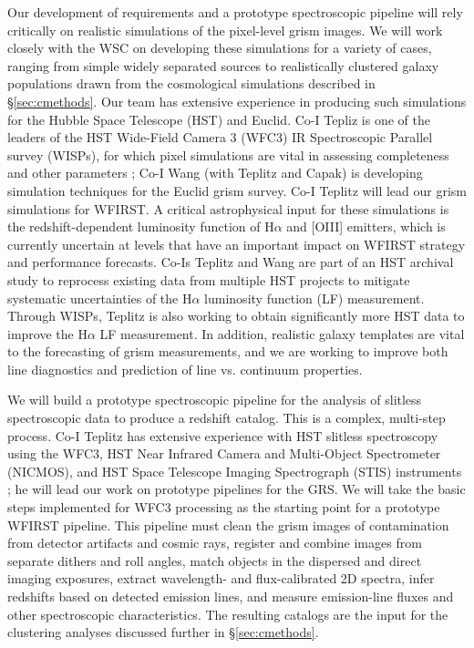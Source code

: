  Our development of requirements and a prototype spectroscopic
pipeline will rely critically on realistic simulations of the
pixel-level grism images.  We will work closely with the WSC on
developing these simulations for a variety of cases, ranging from
simple widely separated sources to realistically clustered galaxy
populations drawn from the cosmological simulations described in
\S\ref{sec:cmethods}.  Our team has extensive experience in producing
such simulations for the Hubble Space Telescope (HST) and Euclid.  Co-I Tepliz is one of the leaders
of the HST Wide-Field Camera 3 (WFC3) IR Spectroscopic Parallel survey (WISPs), for which
pixel simulations are vital in assessing completeness and other
parameters \cite{Colbert13}; Co-I Wang (with Teplitz and Capak) is
developing simulation techniques for the Euclid grism survey.
Co-I Teplitz will lead our grism simulations for WFIRST.
A critical astrophysical input for these simulations is the
redshift-dependent luminosity function of H$\alpha$ and [OIII]
emitters, which is currently uncertain at levels that have an
important impact on WFIRST strategy and performance forecasts.  Co-Is
Teplitz and Wang are part of an HST archival study to reprocess
existing data from multiple HST projects to mitigate systematic
uncertainties of the H$\alpha$ luminosity function (LF) measurement.  Through WISPs, Teplitz
is also working to obtain significantly more HST data to improve the
H$\alpha$ LF measurement.  In addition, realistic galaxy templates are
vital to the forecasting of grism measurements, and we are working to
improve both line diagnostics and prediction of line vs. continuum
properties.

 We will build a prototype spectroscopic pipeline for the analysis of
slitless spectroscopic data to produce a redshift catalog.  This is a
complex, multi-step process.  Co-I Teplitz has extensive experience
with HST slitless spectroscopy using the WFC3, HST Near Infrared Camera and
Multi-Object Spectrometer (NICMOS), and HST Space Telescope Imaging
Spectrograph (STIS) instruments \cite{Atek10,Shim09,Teplitz03}; he
will lead our work on prototype pipelines for the GRS. We will take the basic steps
implemented for WFC3 processing as the starting point for a prototype
WFIRST pipeline. This pipeline must clean the grism images of contamination
from detector artifacts and cosmic rays, register and combine images
from separate dithers and roll angles, match objects in the dispersed
and direct imaging exposures, extract wavelength- and flux-calibrated
2D spectra, infer redshifts based on detected emission lines, and
measure emission-line fluxes and other spectroscopic characteristics.
The resulting catalogs are the input for the clustering analyses
discussed further in \S\ref{sec:cmethods}.

